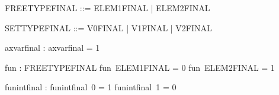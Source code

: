 %
\begin{zed}
   FREETYPEFINAL ::= ELEM1FINAL | ELEM2FINAL
\end{zed}

\begin{zed}
   SETTYPEFINAL ::= V0FINAL | V1FINAL | V2FINAL
\end{zed}


\begin{axdef}
  axvarfinal : \nat
\where
  axvarfinal = 1
\end{axdef}


\begin{axdef}
      fun : FREETYPEFINAL \pfun \nat
    \where
      fun~ELEM1FINAL = 0 \land
      fun~ELEM2FINAL = 1
\end{axdef}

\begin{axdef}
      funintfinal : \nat \pfun \nat
    \where
      funintfinal~0 = 1 \land
      funintfinal~1 = 0
\end{axdef}

